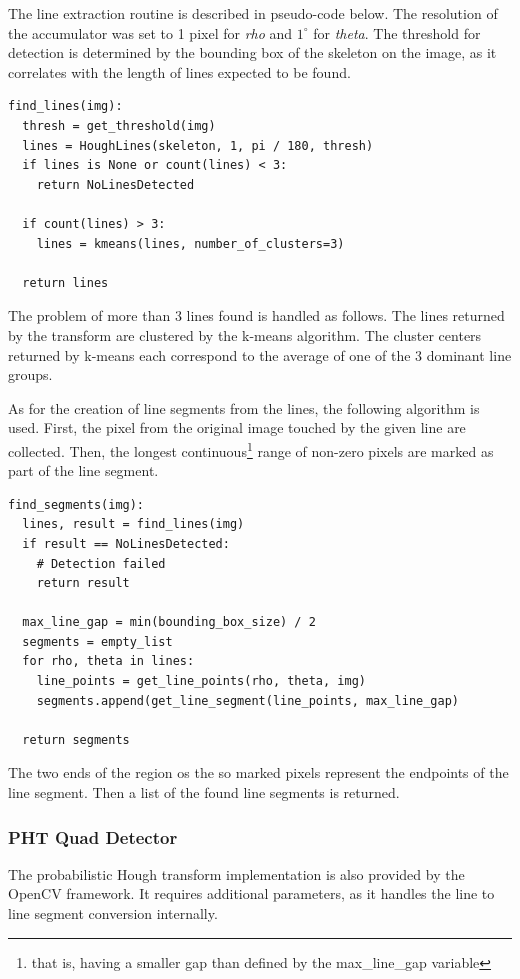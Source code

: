 The line extraction routine is described in pseudo-code below.
The resolution of the accumulator was set to 1 pixel for \textit{rho} and $1^\circ$ for \textit{theta}.
The threshold for detection is determined by the bounding box of the skeleton on the image, as it correlates with the length of lines expected to be found.
\begin{lstlisting}
find_lines(img):
  thresh = get_threshold(img)
  lines = HoughLines(skeleton, 1, pi / 180, thresh)
  if lines is None or count(lines) < 3:
    return NoLinesDetected

  if count(lines) > 3:
    lines = kmeans(lines, number_of_clusters=3)
	
  return lines
\end{lstlisting}
The problem of more than 3 lines found is handled as follows.
The lines returned by the transform are clustered by the k-means algorithm.
The cluster centers returned by k-means each correspond to the average of one of the 3 dominant line groups.

As for the creation of line segments from the lines, the following algorithm is used.
First, the pixel from the original image touched by the given line are collected.
Then, the longest continuous\footnote{that is, having a smaller gap than defined by the max\_line\_gap variable} range of non-zero pixels are marked as part of the line segment.
\begin{lstlisting}
find_segments(img):
  lines, result = find_lines(img)
  if result == NoLinesDetected:
    # Detection failed
    return result
	
  max_line_gap = min(bounding_box_size) / 2
  segments = empty_list
  for rho, theta in lines:
    line_points = get_line_points(rho, theta, img)
    segments.append(get_line_segment(line_points, max_line_gap)
	
  return segments
\end{lstlisting}
The two ends of the region os the so marked pixels represent the endpoints of the line segment.
Then a list of the found line segments is returned.

\subsubsection{PHT Quad Detector}

The probabilistic Hough transform implementation is also provided by the OpenCV framework.
It requires additional parameters, as it handles the line to line segment conversion internally.

